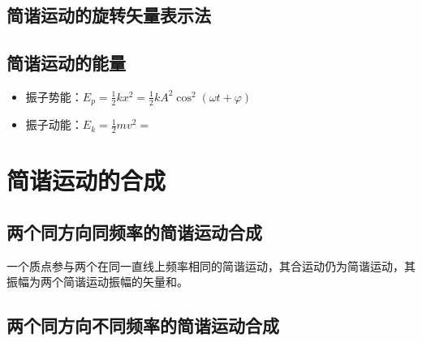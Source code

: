 \documentclass[12pt, a4paper, oneside]{ctexbook}
\begin{document}
\subsection{简谐运动的旋转矢量表示法}

\subsection{简谐运动的能量}
\begin{itemize}
    \item 振子势能：$E_p = \frac{1}{2}kx^2 = \frac{1}{2}kA^2\cos^2{(\omega t + \varphi)}$
    \item 振子动能：$E_k = \frac{1}{2}mv^2 = $
\end{itemize}

\section{简谐运动的合成}
\subsection{两个同方向同频率的简谐运动合成}
一个质点参与两个在同一直线上频率相同的简谐运动，其合运动仍为简谐运动，其振幅为两个简谐运动振幅的矢量和。
\subsection{两个同方向不同频率的简谐运动合成}
\end{document}

